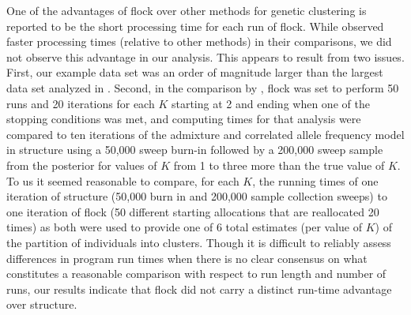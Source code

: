  
One of the advantages of {\sc flock} over other methods for genetic clustering
is reported to be the short processing time for each run of {\sc flock}.
While \citet{Duc&Tur2012} observed faster processing times (relative to other methods) in their 
comparisons, we did not observe this advantage in our analysis. This appears to result from two issues. First,
our example data set was an order of magnitude larger than the largest data set analyzed in \citet{Duc&Tur2012}.  
Second, in the comparison by \citet{Duc&Tur2012}, 
{\sc flock} was set to perform 50 runs and 20 iterations for each $K$ starting at 2 and ending when 
one of the stopping conditions was met, and computing times for that analysis were compared to ten iterations of 
the admixture and correlated allele frequency model in {\sc structure} using 
a 50,000 sweep burn-in followed 
by a 200,000 sweep sample from the posterior for values of $K$ from 1 to three more than the true 
value of $K$. 
To us it seemed reasonable to compare, for each $K$, the running times of one iteration of {\sc structure} (50,000 
burn in and 200,000 sample collection sweeps)
to one iteration of {\sc flock} (50 different starting allocations that are reallocated 20 times) 
as both were used to provide one of 6 total estimates (per value of $K$) of the partition of individuals into 
clusters. Though
it is difficult to reliably assess differences in program run times when there is no clear consensus on what 
constitutes a reasonable comparison with respect to run length and number of runs, our results indicate that {\sc flock} did not carry a distinct run-time advantage over {\sc structure}.

